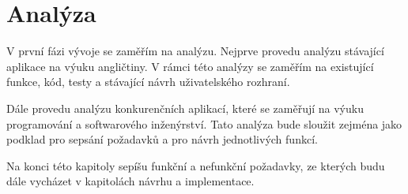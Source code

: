 \chapter{Analýza}

V první fázi vývoje se zaměřím na analýzu. Nejprve provedu analýzu stávající aplikace na výuku angličtiny. V rámci této analýzy se zaměřím na existující funkce, kód, testy a stávající návrh uživatelského rozhraní.

Dále provedu analýzu konkurenčních aplikací, které se zaměřují na výuku programování a softwarového inženýrství. Tato analýza bude sloužit zejména jako podklad pro sepsání požadavků a pro návrh jednotlivých funkcí.

Na konci této kapitoly sepíšu funkční a nefunkční požadavky, ze kterých budu dále vycházet v kapitolách návrhu a implementace.
